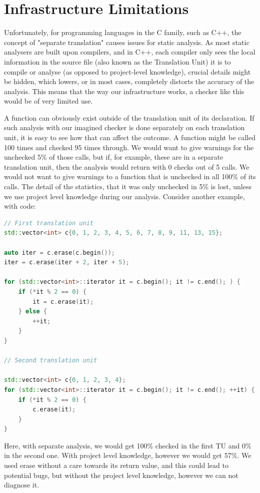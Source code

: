 \section{Infrastructure Limitations}

Unfortunately, for programming languages in the C family, such as C++, the concept of "separate translation" causes issues for static
analysis. As most static analysers are built upon compilers, and in C++, each compiler only sees the local information in the source file
(also known as the Translation Unit) it is to compile or analyse (as opposed to project-level knowledge), crucial details
might be hidden, which lowers, or in most cases, completely distorts the accuracy of the analysis.
This means that the way our infrastructure works, a checker like this would be of very limited use.

A function can obviously exist outside of the translation unit of its declaration. If such analysis with our imagined checker is done
separately on each translation unit, it is easy to see how that can affect the outcome. A function might be called 100 times and 
checked 95 times through. We would want to give warnings for the unchecked 5\% of those calls, but if, for example, these are in a 
separate translation unit, then the analysis would return with 0 checks out of 5 calls. We would not want to give warnings to a
function that is unchecked in all 100\% of its calls. The detail of the statistics, that it was only unchecked in 5\% is lost,
unless we use project level knowledge during our analysis. Consider another example, with code:

\begin{lstlisting}[language={C++},caption={An example of the infrastructure's limitations},label={lst:motivation example}]
// First translation unit
std::vector<int> c{0, 1, 2, 3, 4, 5, 6, 7, 8, 9, 11, 13, 15};

auto iter = c.erase(c.begin());
iter = c.erase(iter + 2, iter + 5);

for (std::vector<int>::iterator it = c.begin(); it != c.end(); ) {
    if (*it % 2 == 0) {
        it = c.erase(it);
    } else {
        ++it;
    }
}

// Second translation unit

std::vector<int> c{0, 1, 2, 3, 4};
for (std::vector<int>::iterator it = c.begin(); it != c.end(); ++it) {
    if (*it % 2 == 0) {
        c.erase(it);
    }
}
\end{lstlisting}

Here, with separate analysis, we would get 100\% checked in the first TU and 0\% in the second one. With project level knowledge, however we
would get 57\%. We used erase without a care towards its return value, and this could lead to potential bugs, but without the project
level knowledge, however we can not diagnose it.

